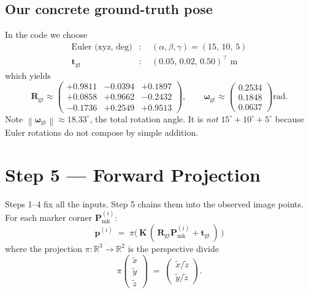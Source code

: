\documentclass[11pt]{article}
\newcommand{\R}{\mathbb{R}}
\newcommand{\norm}[1]{\left\lVert #1 \right\rVert}
\newcommand{\Rgt}{\mathbf{R}_{\text{gt}}}
\newcommand{\tgt}{\mathbf{t}_{\text{gt}}}
\newcommand{\wgt}{\boldsymbol{\omega}_{\text{gt}}}
\newcommand{\Pmark}{\mathbf{P}_{\text{mk}}}
\newcommand{\KK}{\mathbf{K}}
\begin{document}
\subsection{Our concrete ground-truth pose}

In the code we choose
\begin{align}
  \text{Euler (xyz, deg)} & : \quad (\alpha, \beta, \gamma) = (15,\,10,\,5) \\
  \tgt & : \quad (0.05,\, 0.02,\, 0.50)^\top \;\text{m}
\end{align}
which yields
\[
  \Rgt \approx
  \begin{pmatrix}
    +0.9811 & -0.0394 & +0.1897 \\
    +0.0858 & +0.9662 & -0.2432 \\
    -0.1736 & +0.2549 & +0.9513
  \end{pmatrix},
  \qquad
  \wgt \approx
  \begin{pmatrix} 0.2534 \\ 0.1848 \\ 0.0637 \end{pmatrix} \text{rad}.
\]
Note $\norm{\wgt} \approx 18.33^\circ$, the total rotation angle. It is
\emph{not} $15^\circ + 10^\circ + 5^\circ$ because Euler rotations do not
compose by simple addition.

\section{Step 5 --- Forward Projection}

Steps 1--4 fix all the inputs. Step 5 chains them into the observed image
points. For each marker corner $\Pmark^{(i)}$:
\begin{equation}
  \boxed{\quad
    \mathbf{p}^{(i)}
    \;=\;
    \pi\!\Big(\, \KK\,(\,\Rgt \Pmark^{(i)} + \tgt\,) \,\Big)
  \quad}
  \label{eq:full-projection}
\end{equation}
where the projection $\pi:\R^3 \to \R^2$ is the perspective divide
\begin{equation}
  \pi\!\begin{pmatrix} \tilde x \\ \tilde y \\ \tilde z \end{pmatrix}
  \;=\;
  \begin{pmatrix} \tilde x / \tilde z \\ \tilde y / \tilde z \end{pmatrix}.
\end{equation}
\end{document}
